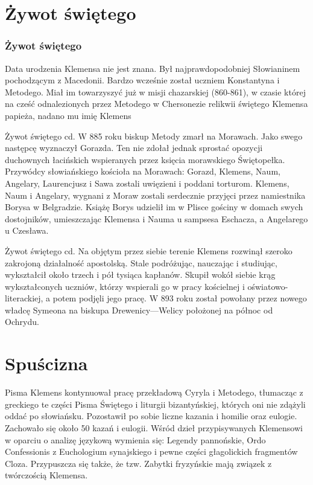 \documentclass{beamer}
\begin{document}
\section{Żywot świętego}
\begin{frame}
\frametitle{Żywot świętego}
Data urodzenia Klemensa nie jest znana. Był najprawdopodobniej Słowianinem pochodzącym z Macedonii. Bardzo wcześnie został uczniem Konstantyna i Metodego. Miał im towarzyszyć już w misji chazarskiej (860-861), w czasie której na cześć odnalezionych przez Metodego w Chersonezie relikwii świętego Klemensa papieża, nadano mu imię Klemens
\end{frame}

\begin{frame}{Żywot świętego cd.}
W 885 roku biskup Metody zmarł na Morawach. Jako swego następcę wyznaczył Gorazda. Ten nie zdołał jednak sprostać opozycji duchownych łacińskich wspieranych przez księcia morawskiego Świętopełka. Przywódcy słowiańskiego kościoła na Morawach: Gorazd, Klemens, Naum, Angelary, Laurencjusz i Sawa zostali uwięzieni i poddani torturom. Klemens, Naum i Angelary, wygnani z Moraw zostali serdecznie przyjęci przez namiestnika Borysa w Belgradzie. Książę Borys udzielił im w Plisce gościny w domach swych dostojników, umieszczając Klemensa i Nauma u sampsesa Eschacza, a Angelarego u Czesława.
\end{frame}

\begin{frame}{Żywot świętego cd.}
Na objętym przez siebie terenie Klemens rozwinął szeroko zakrojoną działalność apostolską. Stale podróżując, nauczając i studiując, wykształcił około trzech i pół tysiąca kapłanów. Skupił wokół siebie krąg wykształconych uczniów, którzy wspierali go w pracy kościelnej i oświatowo-literackiej, a potem podjęli jego pracę. W 893 roku został powołany przez nowego władcę Symeona na biskupa Drewenicy---Welicy położonej na północ od Ochrydu.
\end{frame}

\section{Spuścizna}
\begin{frame}{Pisma}
Klemens kontynuował pracę przekładową Cyryla i Metodego, tłumacząc z greckiego te części Pisma Świętego i liturgii bizantyńskiej, których oni nie zdążyli oddać po słowiańsku. Pozostawił po sobie liczne kazania i homilie oraz eulogie. Zachowało się około 50 kazań i eulogii. Wśród dzieł przypisywanych Klemensowi w oparciu o analizę językową wymienia się: Legendy pannońskie, Ordo Confessionis z Euchologium synajskiego i pewne części głagolickich fragmentów Cloza. Przypuszcza się także, że tzw. Zabytki fryzyńskie mają związek z twórczością Klemensa.
\end{frame}
\end{document}
